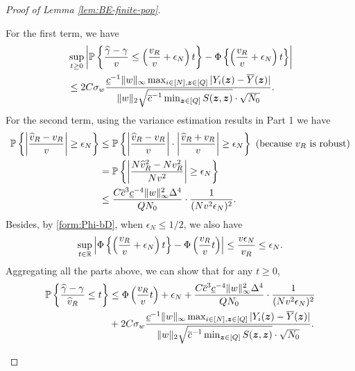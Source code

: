 \documentclass[12pt]{article}
\begin{document}
{\begin{proof}[Proof of Lemma \ref{lem:BE-finite-pop}]
\begin{enumerate}
    For the first term, we have
    \begin{align*}
        &\sup_{t\ge 0}\left|{\mathbb{P}}\left\{\frac{{\widehat{\gamma}} - \gamma}{{v}}   \le \left(\frac{{v}_R}{v} + \epsilon_N\right)t\right\} - \Phi\left\{\left(\frac{{v}_R}{v} + \epsilon_N\right)t \right\}\right| \\
        &\le 2C\sigma_w   \frac{\underline{c}^{-1}  \|w\|_{\infty}   \max_{i\in[N],{\boldsymbol{z}}\in[Q]}|Y_i({\boldsymbol{z}})-\overline{Y}({\boldsymbol{z}})|}{\|w\|_2\sqrt{\overline{c}^{-1} \min_{{\boldsymbol{z}}\in[Q]} S({\boldsymbol{z}},{\boldsymbol{z}})}\cdot \sqrt{ N_0}}.
    \end{align*}
    For the second term, using the variance estimation results in Part 1 we have
    \begin{align*}
        {\mathbb{P}}\left\{ \left|\frac{\widehat{v}_R - v_R}{v}\right| \ge \epsilon_N\right\} &\le  {\mathbb{P}}\left\{ \left|\frac{\widehat{v}_R - v_R}{v}\right|\cdot\left|\frac{\widehat{v}_R + v_R}{v}\right| \ge \epsilon_N\right\} \text{ (because $v_R$ is robust)}\\
        & =  {\mathbb{P}}\left\{ \left|\frac{N\widehat{v}^2_R - Nv^2_R}{Nv^2}\right| \ge \epsilon_N\right\}   \\
        & \le \frac{C\overline{c}^3\underline{c}^{-4} \|w\|_\infty^2 \Delta^4 }{QN_0}\cdot \frac{1}{(Nv^2\epsilon_N)^2}.
    \end{align*}
    Besides, by \eqref{form:Phi-bD}, when $\epsilon_N\le 1/2$, we also have
    \begin{align*}
        \sup_{t\in{\mathbb{R}}}\left|\Phi\left\{\left(\frac{{v}_R}{v} + \epsilon_N \right)t \right\} - \Phi\left(\frac{v_R}{v}t\right)\right| \le \frac{v\epsilon_N}{v_R} \le \epsilon_N. 
    \end{align*}
    Aggregating all the parts above, we can show that for any $t\ge 0$,
    \begin{align*}
        {\mathbb{P}}\left\{\frac{{\widehat{\gamma}} - \gamma}{\widehat{v}_R} \le t\right\} &\le \Phi\left(\frac{v_R}{v}t\right) + \epsilon_N +  \frac{C\overline{c}^3\underline{c}^{-4} \|w\|_\infty^2 \Delta^4 }{QN_0}\cdot \frac{1}{(Nv^2\epsilon_N)^2} \\
        &+ 2C\sigma_w   \frac{\underline{c}^{-1}  \|w\|_{\infty}   \max_{i\in[N],{\boldsymbol{z}}\in[Q]}|Y_i({\boldsymbol{z}})-\overline{Y}({\boldsymbol{z}})|}{\|w\|_2\sqrt{\overline{c}^{-1} \min_{{\boldsymbol{z}}\in[Q]} S({\boldsymbol{z}},{\boldsymbol{z}})}\cdot \sqrt{N_0}}.
    \end{align*}
    

\end{enumerate}
\end{proof}}
\end{document}
